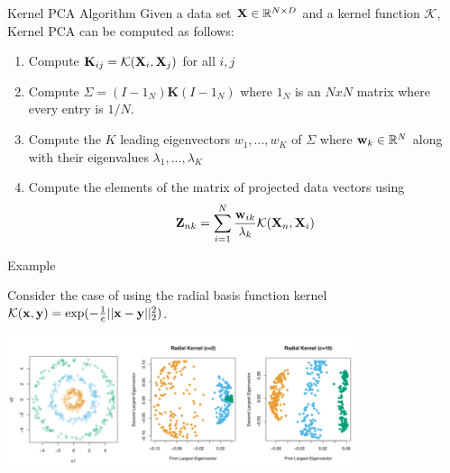 \documentclass[serif,xcolor=pdftex,dvipsnames,table,hyperref={bookmarks=false,breaklinks}]{beamer}
\begin{document}
\begin{frame}[t]{Kernel PCA Algorithm}
Given a data set ${\mathbf{X}}\in\mathbb{R}^{N\times D}$ and a kernel function 
$\mathcal{K}$, Kernel PCA can be computed as follows:

\begin{enumerate}
\pause\item Compute $\mathbf{K}_{ij} = \mathcal{K}({\mathbf{X}}_i,{\mathbf{X}}_j)$ for 
all $i,j$

\pause\item Compute $\Sigma = (I-1_N)\mathbf{K}(I-1_N)$ where $1_N$ is an $NxN$ 
matrix where every entry is $1/N$.

\pause\item Compute the $K$ leading eigenvectors $w_1,...,w_K$ of $\Sigma$ 
where ${\mathbf{w}}_k \in \mathbb{R}^N$ along with their eigenvalues 
$\lambda_1,...,\lambda_K$

\pause\item Compute the elements of the matrix of projected data vectors using
$${\mathbf{Z}}_{nk} = \sum_{i=1}^N \frac{{\mathbf{w}}_{ik}}{\lambda_k} 
\mathcal{K}({\mathbf{X}}_n,{\mathbf{X}}_i)$$
\end{enumerate} 
\end{frame}

\begin{frame}[t]{Example}

Consider the case of using the radial basis function kernel
$\mathcal{K}({\mathbf{x}},{\mathbf{y}}) = \exp(-\frac{1}{c}||{\mathbf{x}}-{\mathbf{y}}||_2^2)$.

\center
\includegraphics[width=4in]{../Figures/kpca.png}

\end{frame}
\end{document}
